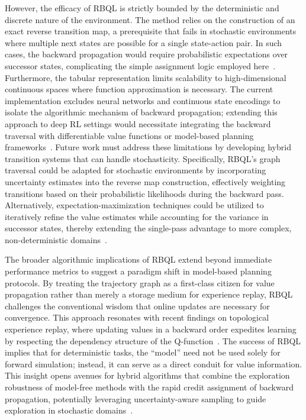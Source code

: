 \documentclass[manuscript, screen, review]{jair}
\begin{document}
However, the efficacy of RBQL is strictly bounded by the deterministic and discrete nature of the environment. The method relies on the construction of an exact reverse transition map, a prerequisite that fails in stochastic environments where multiple next states are possible for a single state-action pair. In such cases, the backward propagation would require probabilistic expectations over successor states, complicating the simple assignment logic employed here~\cite{Diekhoff2024RecursiveBQ}. Furthermore, the tabular representation limits scalability to high-dimensional continuous spaces where function approximation is necessary. The current implementation excludes neural networks and continuous state encodings to isolate the algorithmic mechanism of backward propagation; extending this approach to deep RL settings would necessitate integrating the backward traversal with differentiable value functions or model-based planning frameworks~\cite{Park2025FlowQ}. Future work must address these limitations by developing hybrid transition systems that can handle stochasticity. Specifically, RBQL's graph traversal could be adapted for stochastic environments by incorporating uncertainty estimates into the reverse map construction, effectively weighting transitions based on their probabilistic likelihoods during the backward pass. Alternatively, expectation-maximization techniques could be utilized to iteratively refine the value estimates while accounting for the variance in successor states, thereby extending the single-pass advantage to more complex, non-deterministic domains~\cite{Lee2018SampleEfficientDR}.

The broader algorithmic implications of RBQL extend beyond immediate performance metrics to suggest a paradigm shift in model-based planning protocols. By treating the trajectory graph as a first-class citizen for value propagation rather than merely a storage medium for experience replay, RBQL challenges the conventional wisdom that online updates are necessary for convergence. This approach resonates with recent findings on topological experience replay, where updating values in a backward order expedites learning by respecting the dependency structure of the Q-function~\cite{Hong2022TopologicalER}. The success of RBQL implies that for deterministic tasks, the ``model'' need not be used solely for forward simulation; instead, it can serve as a direct conduit for value information. This insight opens avenues for hybrid algorithms that combine the exploration robustness of model-free methods with the rapid credit assignment of backward propagation, potentially leveraging uncertainty-aware sampling to guide exploration in stochastic domains~\cite{CarrascoDavis2025UncertaintyPE}.
\end{document}
